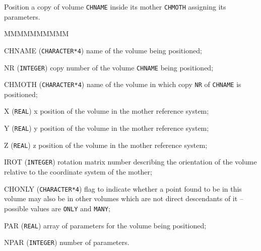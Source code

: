                


Position a copy of volume {\tt CHNAME} inside its mother {\tt CHMOTH}
assigning its parameters.

\begin{DLtt}{MMMMMMMMMM}
\item[CHNAME] ({\tt CHARACTER*4}) name of the volume being positioned;
\item[NR] ({\tt INTEGER}) copy number of the volume {\tt CHNAME} being
positioned;
\item[CHMOTH]({\tt CHARACTER*4}) name of the volume in which copy
{\tt NR} of {\tt CHNAME} is positioned;
\item[X] ({\tt REAL}) x position of the volume in the mother reference system;
\item[Y] ({\tt REAL}) y position of the volume in the mother reference system;
\item[Z] ({\tt REAL}) z position of the volume in the mother reference system;
\item[IROT] ({\tt INTEGER}) rotation matrix number
describing the orientation of the volume relative to
the coordinate system of the mother;
\item[CHONLY] ({\tt CHARACTER*4}) flag to indicate whether
a point found to be in this volume may also be in other volumes which
are not direct descendants of it -- possible values are {\tt ONLY} and
{\tt MANY};
\item[PAR] ({\tt REAL}) array of parameters for the volume being positioned;
\item[NPAR] ({\tt INTEGER}) number of parameters.
\end{DLtt}

